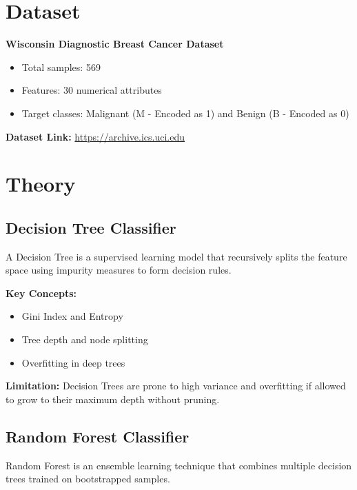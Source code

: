 \documentclass[11pt]{article}
\begin{document}

\section*{Dataset}
\textbf{Wisconsin Diagnostic Breast Cancer Dataset}

\begin{itemize}
    \item Total samples: 569
    \item Features: 30 numerical attributes
    \item Target classes: Malignant (M - Encoded as 1) and Benign (B - Encoded as 0)
\end{itemize}

\textbf{Dataset Link:}  
\href{https://archive.ics.uci.edu/dataset/17/breast+cancer+wisconsin+diagnostic}{https://archive.ics.uci.edu}


\section*{Theory}

\subsection*{Decision Tree Classifier}
A Decision Tree is a supervised learning model that recursively splits the feature space using impurity measures to form decision rules.

\textbf{Key Concepts:}
\begin{itemize}
    \item Gini Index and Entropy
    \item Tree depth and node splitting
    \item Overfitting in deep trees
\end{itemize}

\textbf{Limitation:}  
Decision Trees are prone to high variance and overfitting if allowed to grow to their maximum depth without pruning.

\subsection*{Random Forest Classifier}
Random Forest is an ensemble learning technique that combines multiple decision trees trained on bootstrapped samples.
\end{document}
